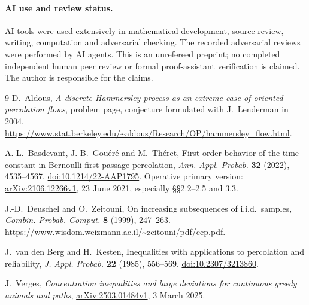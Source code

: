 \documentclass[11pt]{article}
\begin{document}
\paragraph{AI use and review status.}
AI tools were used extensively in mathematical development, source
review, writing, computation and adversarial checking. The recorded
adversarial reviews were performed by AI agents. This is an
unrefereed preprint; no completed independent human peer review or
formal proof-assistant verification is claimed. The author is
responsible for the claims.

\begin{thebibliography}{9}
D.~Aldous, \emph{A discrete Hammersley process as an extreme case of
oriented percolation flows}, problem page, conjecture formulated
with J.~Lenderman in 2004.
\url{https://www.stat.berkeley.edu/~aldous/Research/OP/hammersley_flow.html}.

A.-L.~Basdevant, J.-B.~Gou\'er\'e and M.~Th\'eret,
First-order behavior of the time constant in Bernoulli first-passage
percolation, \emph{Ann. Appl. Probab.} \textbf{32} (2022), 4535--4567.
\href{https://doi.org/10.1214/22-AAP1795}{doi:10.1214/22-AAP1795}.
Operative primary version:
\href{https://arxiv.org/abs/2106.12266v1}{arXiv:2106.12266v1},
23 June 2021, especially \S\S2.2--2.5 and 3.3.

J.-D.~Deuschel and O.~Zeitouni,
On increasing subsequences of i.i.d.\ samples,
\emph{Combin. Probab. Comput.} \textbf{8} (1999), 247--263.
\url{https://www.wisdom.weizmann.ac.il/~zeitouni/pdf/ccp.pdf}.

J.~van den Berg and H.~Kesten, Inequalities with applications to
percolation and reliability, \emph{J. Appl. Probab.}
\textbf{22} (1985), 556--569.
\href{https://doi.org/10.2307/3213860}{doi:10.2307/3213860}.

J.~Verges, \emph{Concentration inequalities and large deviations for
continuous greedy animals and paths},
\href{https://arxiv.org/abs/2503.01484v1}{arXiv:2503.01484v1},
3 March 2025.
\end{thebibliography}
\end{document}
